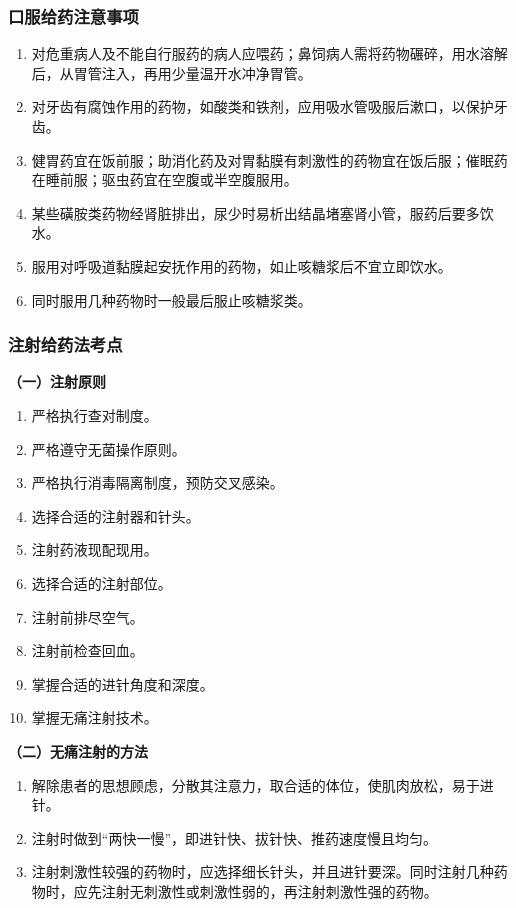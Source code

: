 \documentclass[11pt, a4paper]{ctexart}
\begin{document}
\subsubsection{口服给药注意事项}
\begin{enumerate}
	\item 对危重病人及不能自行服药的病人应喂药；鼻饲病人需将药物碾碎，用水溶解后，从胃管注入，再用少量温开水冲净胃管。
	\item 对牙齿有腐蚀作用的药物，如酸类和铁剂，应用吸水管吸服后漱口，以保护牙齿。
	\item 健胃药宜在饭前服；助消化药及对胃黏膜有刺激性的药物宜在饭后服；催眠药在睡前服；驱虫药宜在空腹或半空腹服用。
	\item 某些磺胺类药物经肾脏排出，尿少时易析出结晶堵塞肾小管，服药后要多饮水。
	\item 服用对呼吸道黏膜起安抚作用的药物，如止咳糖浆后不宜立即饮水。
	\item 同时服用几种药物时一般最后服止咳糖浆类。
\end{enumerate}

\subsubsection{注射给药法考点}
\textbf{（一）注射原则}
\begin{enumerate}
	\item 严格执行查对制度。
	\item 严格遵守无菌操作原则。
	\item 严格执行消毒隔离制度，预防交叉感染。
	\item 选择合适的注射器和针头。
	\item 注射药液现配现用。
	\item 选择合适的注射部位。
	\item 注射前排尽空气。
	\item 注射前检查回血。
	\item 掌握合适的进针角度和深度。
	\item 掌握无痛注射技术。
\end{enumerate}

\textbf{（二）无痛注射的方法}
\begin{enumerate}
	\item 解除患者的思想顾虑，分散其注意力，取合适的体位，使肌肉放松，易于进针。
	\item 注射时做到“两快一慢”，即进针快、拔针快、推药速度慢且均匀。
	\item 注射刺激性较强的药物时，应选择细长针头，并且进针要深。同时注射几种药物时，应先注射无刺激性或刺激性弱的，再注射刺激性强的药物。
\end{enumerate}
\end{document}
